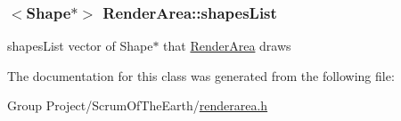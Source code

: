 \subsubsection[{\texorpdfstring{shapes\+List}{shapesList}}]{$<${\bf Shape}$\ast$$>$ Render\+Area\+::shapes\+List}\hypertarget{classRenderArea_a3502e321d5130cd9029c45c7238979e6}{}\label{classRenderArea_a3502e321d5130cd9029c45c7238979e6}


shapes\+List vector of Shape$\ast$ that \hyperlink{classRenderArea}{Render\+Area} draws 



The documentation for this class was generated from the following file\+:\begin{DoxyCompactItemize}
\item 
Group Project/\+Scrum\+Of\+The\+Earth/\hyperlink{renderarea_8h}{renderarea.\+h}\end{DoxyCompactItemize}
